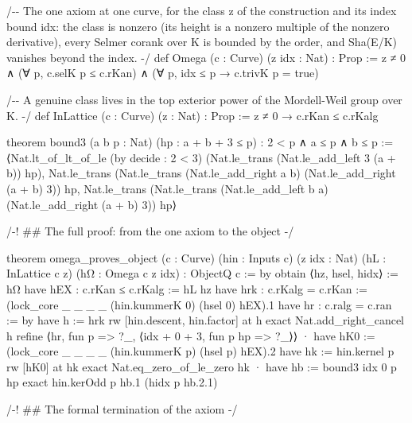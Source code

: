 \documentclass[10pt,twocolumn]{article}
\newenvironment{Shaded}{}{}
\newcommand{\NormalTok}[1]{#1}
\providecommand{\NormalTok}[1]{#1}
\providecommand{\NormalTok}[1]{#1}
\begin{document}
\begin{strip}
\begin{Shaded}
\begin{Highlighting}[]
\NormalTok{/{-}{-} The one axiom at one curve, for the class z of the construction and its index bound idx:}
\NormalTok{    the class is nonzero (its height is a nonzero multiple of the nonzero derivative),}
\NormalTok{    every Selmer corank over K is bounded by the order, and Sha(E/K) vanishes beyond the index. {-}/}
\NormalTok{def Omega (c : Curve) (z idx : Nat) : Prop :=}
\NormalTok{  z ≠ 0 ∧ (∀ p, c.selK p ≤ c.rKan) ∧ (∀ p, idx ≤ p → c.trivK p = true)}

\NormalTok{/{-}{-} A genuine class lives in the top exterior power of the Mordell{-}Weil group over K. {-}/}
\NormalTok{def InLattice (c : Curve) (z : Nat) : Prop := z ≠ 0 → c.rKan ≤ c.rKalg}

\NormalTok{theorem bound3 (a b p : Nat) (hp : a + b + 3 ≤ p) : 2 \textless{} p ∧ a ≤ p ∧ b ≤ p :=}
\NormalTok{  ⟨Nat.lt\_of\_lt\_of\_le (by decide : 2 \textless{} 3) (Nat.le\_trans (Nat.le\_add\_left 3 (a + b)) hp),}
\NormalTok{   Nat.le\_trans (Nat.le\_trans (Nat.le\_add\_right a b) (Nat.le\_add\_right (a + b) 3)) hp,}
\NormalTok{   Nat.le\_trans (Nat.le\_trans (Nat.le\_add\_left b a) (Nat.le\_add\_right (a + b) 3)) hp⟩}

\NormalTok{/{-}! \#\# The full proof: from the one axiom to the object {-}/}

\NormalTok{theorem omega\_proves\_object (c : Curve) (hin : Inputs c) (z idx : Nat)}
\NormalTok{    (hL : InLattice c z) (hΩ : Omega c z idx) : ObjectQ c := by}
\NormalTok{  obtain ⟨hz, hsel, hidx⟩ := hΩ}
\NormalTok{  have hEX : c.rKan ≤ c.rKalg := hL hz}
\NormalTok{  have hrk : c.rKalg = c.rKan := (lock\_core \_ \_ \_ \_ (hin.kummerK 0) (hsel 0) hEX).1}
\NormalTok{  have hr : c.ralg = c.ran := by}
\NormalTok{    have h := hrk}
\NormalTok{    rw [hin.descent, hin.factor] at h}
\NormalTok{    exact Nat.add\_right\_cancel h}
\NormalTok{  refine ⟨hr, fun p =\textgreater{} ?\_, ⟨idx + 0 + 3, fun p hp =\textgreater{} ?\_⟩⟩}
\NormalTok{  · have hK0 := (lock\_core \_ \_ \_ \_ (hin.kummerK p) (hsel p) hEX).2}
\NormalTok{    have hk := hin.kernel p}
\NormalTok{    rw [hK0] at hk}
\NormalTok{    exact Nat.eq\_zero\_of\_le\_zero hk}
\NormalTok{  · have hb := bound3 idx 0 p hp}
\NormalTok{    exact hin.kerOdd p hb.1 (hidx p hb.2.1)}

\NormalTok{/{-}! \#\# The formal termination of the axiom {-}/}


\end{Highlighting}
\end{Shaded}
\end{strip}
\end{document}
